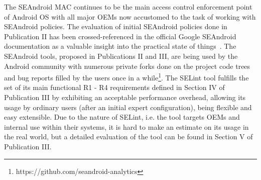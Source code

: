 The SEAndroid MAC continues to be the main access control enforcement point of Android OS with all major OEMs now accustomed to the task of working with SEAndroid policies. The evaluation of initial SEAndroid policies done in Publication II has been crossed-referenced in the official Google SEAndroid documentation as a valuable insight into the practical state of things~\cite{seanroidsize}. The SEAndroid tools, proposed in Publications II and III, are being used by the Android community with numerous private forks done on the project code trees and bug reports filled by the users once in a while\footnote{https://github.com/seandroid-analytics}. The SELint tool fulfills the set of its main functional R1 - R4 requirements defined in Section IV of Publication III by exhibiting an acceptable performance overhead, allowing its usage by ordinary users (after an initial expert configuration), being flexible and easy extensible. Due to the nature of SELint, i.e. the tool targets OEMs and internal use within their systems, it is hard to make an estimate on its usage in the real world, but a detailed evaluation of the tool can be found in Section V of Publication III. 

